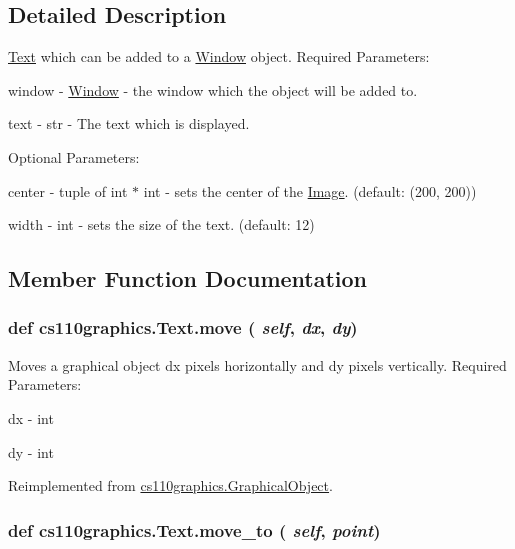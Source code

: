 \subsection{Detailed Description}
\hyperlink{classcs110graphics_1_1Text}{Text} which can be added to a \hyperlink{classcs110graphics_1_1Window}{Window} object. Required Parameters:
\begin{DoxyItemize}
\item window -\/ \hyperlink{classcs110graphics_1_1Window}{Window} -\/ the window which the object will be added to.
\item text -\/ str -\/ The text which is displayed.
\end{DoxyItemize}

Optional Parameters:
\begin{DoxyItemize}
\item center -\/ tuple of int $\ast$ int -\/ sets the center of the \hyperlink{classcs110graphics_1_1Image}{Image}. (default: (200, 200))
\item width -\/ int -\/ sets the size of the text. (default: 12) 
\end{DoxyItemize}

\subsection{Member Function Documentation}
\hypertarget{classcs110graphics_1_1Text_a6bd6f174fc82f2225a4d162ca6b90ec2}{
\subsubsection[{move}]{\setlength{\rightskip}{0pt plus 5cm}def cs110graphics.Text.move ( {\em self}, \/   {\em dx}, \/   {\em dy})}}
\label{classcs110graphics_1_1Text_a6bd6f174fc82f2225a4d162ca6b90ec2}


Moves a graphical object dx pixels horizontally and dy pixels vertically. Required Parameters:
\begin{DoxyItemize}
\item dx -\/ int
\item dy -\/ int 
\end{DoxyItemize}

Reimplemented from \hyperlink{classcs110graphics_1_1GraphicalObject_aa64d270fb83efa4a54e1a7953512f9cd}{cs110graphics.GraphicalObject}.\hypertarget{classcs110graphics_1_1Text_a615a76c8d2edd6c6af5d39d4e2577a27}{
\subsubsection[{move\_\-to}]{\setlength{\rightskip}{0pt plus 5cm}def cs110graphics.Text.move\_\-to ( {\em self}, \/   {\em point})}}
\label{classcs110graphics_1_1Text_a615a76c8d2edd6c6af5d39d4e2577a27}



